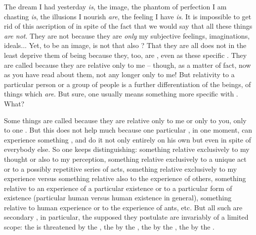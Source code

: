 \pa\label{pa:keepDistinguish} The dream I had yesterday {\em is}, the image, the
phantom of perfection I am chasting {\em is}, the illusions I nourish {\em are},
the feeling I have {\em is}.  It is impossible to get rid of this ascription of
 in spite of the fact that we would say that all these things {\em
  are not}. They are not because they are {\em only} my subjective feelings,
imaginations, ideals... Yet, to be an image, is not that also ?  That
they are all  does not in the least deprive them of being
because they, too, are , even  as these
specific .  They are called  because they are relative
only to me -- though, as a matter of fact, now as you have read about them, not
any longer only to me!  But relativity to a particular person or a group of
people is a further differentiation of the  beings, of things
which {\em are}.
But sure, one usually means something more specific with . What?

Some things are called  because they are relative only to me or only to
you, only to one .
But this does not help much because one particular , in one
 moment, can experience something , and do it not only
entirely on his own but even in spite of everybody else.  So one keeps 
distinguishing: something relative exclusively to my thought or also to my
perception, something relative exclusively to a unique act or to a possibly
repetitive series of acts, something relative exclusively to my experience
versus something relative also to the experience of others, something relative
to an experience of a particular existence or to a particular form of existence
(particular human versus human existence in general), something relative to
human experience or to the experience of ants, etc. But all such are
secondary , in particular, the supposed  they
postulate are invariably of a limited scope: the  is
threatened by the , the  by the , the  by
the , the  by the
.

